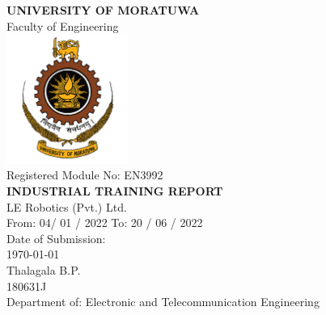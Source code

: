 \begin{titlepage}
\center %


\textbf{\large UNIVERSITY OF MORATUWA }\\[8mm]
{\large Faculty of Engineering}\\[1.5cm]
\includegraphics[width=0.3\textwidth]{figures/uomlogo}\\[1.5cm]


{\large Registered Module No: EN3992}\\[5mm]
\textbf{\large INDUSTRIAL TRAINING REPORT}\\[1cm]


{\large LE Robotics (Pvt.) Ltd.}\\[0.5cm]

{\large From: 04/ 01 / 2022 To: 20 / 06 / 2022}\\[1cm]

{\large Date of Submission:}\\[2mm]
{\large \today} \\[1cm]

{\large Thalagala B.P.}\\[4mm]
{\large 180631J}\\[1cm]

{\large Department of: Electronic and Telecommunication Engineering}


\vfill %

\end{titlepage}